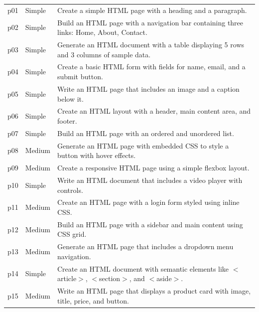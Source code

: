 \begin{longtable}{@{} l l p{13cm} @{}}
	p01         & Simple              & Create a simple HTML page with a heading and a paragraph.                                          \\
	p02         & Simple              & Build an HTML page with a navigation bar containing three links: Home, About, Contact.             \\
	p03         & Simple              & Generate an HTML document with a table displaying 5 rows and 3 columns of sample data.             \\
	p04         & Simple              & Create a basic HTML form with fields for name, email, and a submit button.                         \\
	p05         & Simple              & Write an HTML page that includes an image and a caption below it.                                  \\
	p06         & Simple              & Create an HTML layout with a header, main content area, and footer.                                \\
	p07         & Simple              & Build an HTML page with an ordered and unordered list.                                             \\
	p08         & Medium              & Generate an HTML page with embedded CSS to style a button with hover effects.                      \\
	p09         & Medium              & Create a responsive HTML page using a simple flexbox layout.                                       \\
	p10         & Simple              & Write an HTML document that includes a video player with controls.                                 \\
	p11         & Medium              & Create an HTML page with a login form styled using inline CSS.                                     \\
	p12         & Medium              & Build an HTML page with a sidebar and main content using CSS grid.                                 \\
	p13         & Medium              & Generate an HTML page that includes a dropdown menu navigation.                                    \\
	p14         & Simple              & Create an HTML document with semantic elements like $<$article$>$, $<$section$>$, and $<$aside$>$. \\
	p15         & Medium              & Write an HTML page that displays a product card with image, title, price, and button.              \\

\end{longtable}
